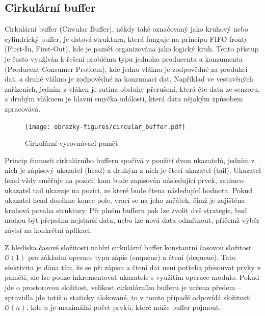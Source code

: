 \newpage

\subsection{Cirkulární buffer}
\label{cirkularni_buffer}
Cirkulární buffer (Circular Buffer), někdy také označovaný jako kruhový nebo cylindrický buffer, je datová struktura, která funguje na principu FIFO fronty (First-In, First-Out), kde je paměť organizována jako logický kruh. Tento přístup je často využíván k řešení problému typu jednoho producenta a konzumenta (Producent-Consumer Problem), kde jedno vlákno je zodpovědné za produkci dat, a druhé vlákno je zodpovědné za konzumaci dat. Například ve vestavěných zařízeních, jedním z vláken je rutina obsluhy přerušení, která čte data ze senzoru, a druhým vláknem je hlavní smyčka události, která data nějakým způsobem zpracovává. \cite{embedjournal_ring_buffer}


\begin{figure}[h]
    \centering
    \texttt{[image: obrazky-figures/circular\_buffer.pdf]}
    
    \caption{Cirkulární vyrovnávací paměť}
    \label{fig:circular-buffer}
\end{figure}

Princip činnosti cirkulárního bufferu spočívá v použití dvou ukazatelů, jedním z nich je zápisový ukazatel (head) a druhým z nich je čtecí ukazatel (tail). Ukazatel head vždy směřuje na pozici, kam bude zapisován následující prvek, zatímco ukazatel tail ukazuje na pozici, ze které bude čtena následující hodnota. Pokud ukazatel head dosáhne konce pole, vrací se na jeho začátek, čímž je zajištěna kruhová povaha struktury. Při plném bufferu pak lze zvolit dvě strategie, buď mohou být přepsána nejstarší data, nebo lze nová data odmítnout, přičemž výběr závisí na konkrétní aplikaci. \cite{embedjournal_ring_buffer, medium_ring_buffer}

Z hlediska časové složitosti nabízí cirkulární buffer konstantní časovou složitost $\mathcal{O}(1)$ pro základní operace typu zápis (enqueue) a čtení (dequeue). Tato efektivita je dána tím, že se při zápisu a čtení dat není potřeba přesouvat prvky v paměti, ale lze pouze inkrementovat ukazatele s využitím operace modulo. Pokud jde o prostorovou složitost, velikost cirkulárního bufferu je určena předem – zpravidla jde totiž o staticky alokované, to v tomto případě odpovídá složitosti $\mathcal{O}(n)$, kde $n$ je maximální počet prvků, které může buffer pojmout. \cite{petrungaro_ring_buffer_complexity}

